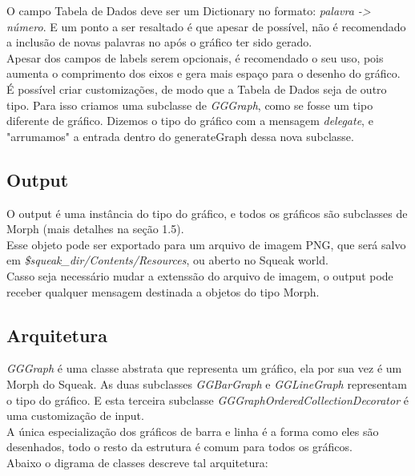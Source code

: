 		O campo Tabela de Dados deve ser um Dictionary no formato: \emph{palavra -> número}. E um ponto a
		ser resaltado é que apesar de possível, não é recomendado a inclusão de novas palavras no após o
		gráfico ter sido gerado.\\

		Apesar dos campos de labels serem opcionais, é recomendado o seu uso, pois aumenta o comprimento
		dos eixos e gera mais espaço para o desenho do gráfico.\\

		É possível criar customizações, de modo que a Tabela de Dados seja de outro tipo. Para isso criamos
		uma subclasse de \emph{GGGraph}, como se fosse um tipo diferente de gráfico. Dizemos o tipo do
		gráfico com a mensagem \emph{delegate}, e "arrumamos" a entrada dentro do generateGraph dessa nova
		subclasse.


	\subsection{Output}
		O output é uma instância do tipo do gráfico, e todos os gráficos são subclasses de Morph (mais
		detalhes na seção 1.5).\\

		Esse objeto pode ser exportado para um arquivo de imagem PNG, que será salvo em
		\emph{\$squeak\_dir/Contents/Resources}, ou aberto no Squeak world.\\

		Casso seja necessário mudar a extenssão do arquivo de imagem, o output pode receber qualquer
		mensagem destinada a objetos do tipo Morph.

	\subsection{Arquitetura}
		\emph{GGGraph} é uma classe abstrata que representa um gráfico, ela por sua vez é um Morph do Squeak.
		As duas subclasses \emph{GGBarGraph} e \emph{GGLineGraph} representam o tipo do gráfico. E esta
		terceira subclasse \emph{GGGraphOrderedCollectionDecorator} é uma customização de input.\\

		A única especialização dos gráficos de barra e linha é a forma como eles são desenhados, todo o
		resto da estrutura é comum para todos os gráficos.\\

		Abaixo o digrama de classes descreve tal arquitetura:\\

